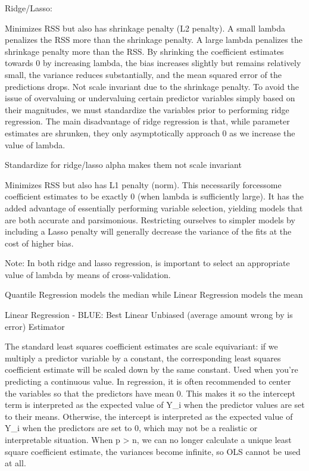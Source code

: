 \documentclass[]{book}
\begin{document}
Ridge/Lasso:

Minimizes RSS but also has shrinkage penalty (L2 penalty). A small lambda penalizes the RSS more than the shrinkage penalty. A large lambda penalizes the shrinkage penalty more than the RSS. By shrinking the coefficient estimates towards 0 by increasing lambda, the bias increases slightly but remains relatively small, the variance reduces substantially, and the mean squared error of the predictions drops. Not scale invariant due to the shrinkage penalty. To avoid the issue of overvaluing or undervaluing certain predictor variables simply based on their magnitudes, we must standardize the variables prior to performing ridge regression. The main disadvantage of ridge regression is that, while parameter estimates are shrunken, they only asymptotically approach 0 as we increase the value of lambda.

Standardize for ridge/lasso alpha makes them not scale invariant

Minimizes RSS but also has L1 penalty (norm). This necessarily forcessome coefficient estimates to be exactly 0 (when lambda is sufficiently large). It has the added advantage of essentially performing variable selection, yielding models that are both accurate and parsimonious. Restricting ourselves to simpler models by including a Lasso penalty will generally decrease the variance of the fits at the cost of higher bias.

Note: In both ridge and lasso regression, is important to select an appropriate value of lambda by means of cross-validation.

Quantile Regression models the median while Linear Regression models the mean

Linear Regression - BLUE: Best Linear Unbiased (average amount wrong by is error) Estimator

The standard least squares coefficient estimates are scale equivariant: if we multiply a predictor variable by a constant, the corresponding least squares coefficient estimate will be scaled down by the same constant. Used when you're predicting a continuous value. In regression, it is often recommended to center the variables so that the predictors have mean 0. This makes it so the intercept term is interpreted as the expected value of Y\_i when the predictor values are set to their means. Otherwise, the intercept is interpreted as the expected value of Y\_i when the predictors are set to 0, which may not be a realistic or interpretable situation. When p \textgreater{} n, we can no longer calculate a unique least square coefficient estimate, the variances become infinite, so OLS cannot be used at all.
\end{document}
